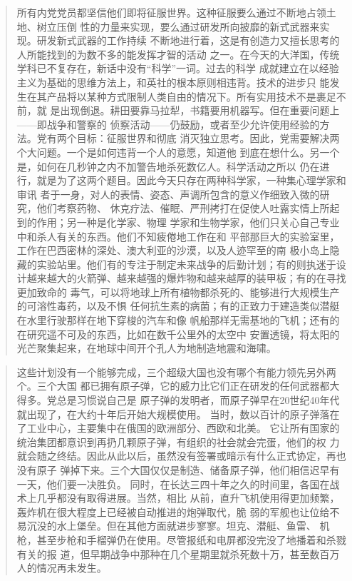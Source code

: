 \begin{quotation}
所有内党党员都坚信他们即将征服世界。这种征服要么通过不断地占领土地、树立压倒
性的力量来实现，要么通过研发所向披靡的新式武器来实现。研发新式武器的工作持续
不断地进行着，这是有创造力又擅长思考的人所能找到的为数不多的能发挥才智的活动
之一。在今天的大洋国，传统学科已不复存在，新话中没有``科学''一词。过去的科学
成就建立在以经验主义为基础的思维方法上，和英社的根本原则相违背。技术的进步只
能发生在其产品将以某种方式限制人类自由的情况下。所有实用技术不是裹足不前，就
是出现倒退。耕田要靠马拉犁，书籍要用机器写。但在重要问题上——即战争和警察的
侦察活动——仍鼓励，或者至少允许使用经验的方法。党有两个目标：征服世界和彻底
消灭独立思考。因此，党需要解决两个大问题。一个是如何违背一个人的意愿，知道他
到底在想什么。另一个是，如何在几秒钟之内不加警告地杀死数亿人。科学活动之所以
仍在进行，就是为了这两个题目。因此今天只存在两种科学家，一种集心理学家和审讯
者于一身，对人的表情、姿态、声调所包含的意义作细致入微的研究，他们考察药物、
休克疗法、催眠、严刑拷打在促使人吐露实情上所起到的作用；另一种是化学家、物理
学家和生物学家，他们只关心自己专业中和杀人有关的东西。他们不知疲倦地工作在和
平部那巨大的实验室里，工作在巴西密林的深处、澳大利亚的沙漠，以及人迹罕至的南
极小岛上隐藏的实验站里。他们有的专注于制定未来战争的后勤计划；有的则执迷于设
计越来越大的火箭弹、越来越强的爆炸物和越来越厚的装甲板；有的在寻找更加致命的
毒气，可以将地球上所有植物都杀死的、能够进行大规模生产的可溶性毒药，以及不惧
任何抗生素的病菌；有的正致力于建造类似潜艇在水里行驶那样在地下穿梭的汽车和像
帆船那样无需基地的飞机；还有的在研究遥不可及的东西，比如在数千公里外的太空中
安置透镜，将太阳的光芒聚集起来，在地球中间开个孔人为地制造地震和海啸。
\end{quotation}

\begin{quotation}
这些计划没有一个能够完成，三个超级大国也没有哪个有能力领先另外两个。三个大国
都已拥有原子弹，它的威力比它们正在研发的任何武器都大得多。党总是习惯说自己是
原子弹的发明者，而原子弹早在20世纪40年代就出现了，在大约十年后开始大规模使用。
当时，数以百计的原子弹落在了工业中心，主要集中在俄国的欧洲部分、西欧和北美。
它让所有国家的统治集团都意识到再扔几颗原子弹，有组织的社会就会完蛋，他们的权
力就会随之终结。因此从此以后，虽然没有签署或暗示有什么正式协定，再也没有原子
弹掉下来。三个大国仅仅是制造、储备原子弹，他们相信迟早有一天，他们要一决胜负。
同时，在长达三四十年之久的时间里，各国在战术上几乎都没有取得进展。当然，相比
从前，直升飞机使用得更加频繁，轰炸机在很大程度上已经被自动推进的炮弹取代，脆
弱的军舰也让位给不易沉没的水上堡垒。但在其他方面就进步寥寥。坦克、潜艇、鱼雷、
机枪，甚至步枪和手榴弹仍在使用。尽管报纸和电屏都没完没了地播着和杀戮有关的报
道，但早期战争中那种在几个星期里就杀死数十万，甚至数百万人的情况再未发生。
\end{quotation}


